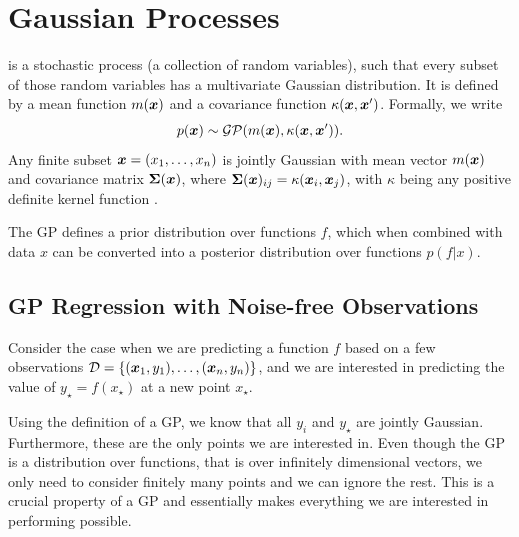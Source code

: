 \section{Gaussian Processes}

 is a stochastic process (a collection of random
variables), such that every subset of those random variables has a
multivariate Gaussian distribution. It is defined by a mean function
$m({\boldsymbol{x}})$ and a covariance function $\kappa({\boldsymbol{x}}, {\boldsymbol{x}}')$. Formally, we write
\begin{equation}
  p({\boldsymbol{x}}) \sim \mathcal{G}\mathcal{P} (m({\boldsymbol{x}}), \kappa({\boldsymbol{x}}, {\boldsymbol{x}}')).
\end{equation}
Any finite subset ${\boldsymbol{x}} = (x_1, \ldots, x_n)$ is jointly Gaussian with mean vector
$m({\boldsymbol{x}})$ and covariance matrix ${\bm{\Sigma}}({\boldsymbol{x}})$, where ${\bm{\Sigma}}({\boldsymbol{x}})_{ij} =
\kappa({\boldsymbol{x}}_i, {\boldsymbol{x}}_j)$, with $\kappa$ being any positive definite kernel
function \citep{murphy2012machine}.

The GP defines a prior distribution over functions $f$, which when
combined with data $x$ can be converted into a posterior distribution
over functions $p(f|x)$.

\subsection{GP Regression with Noise-free Observations}

Consider the case when we are predicting a function $f$
based on a few observations $\mathcal{D} = \{({\boldsymbol{x}}_1, y_1), \ldots, ({\boldsymbol{x}}_n, y_n)\}$,
and we are interested in predicting the value of $y_\star = f(x_\star)$ at a new point
$x_\star$.

Using the definition of a GP, we know that all $y_i$ and $y_\star$ are jointly
Gaussian. Furthermore, these are the only points we are interested
in.  Even though the GP is a distribution over functions, that is over
infinitely dimensional vectors, we only need to consider finitely many
points and we can ignore the rest.  This is a crucial property of a GP and
essentially makes everything we are interested in performing possible.

